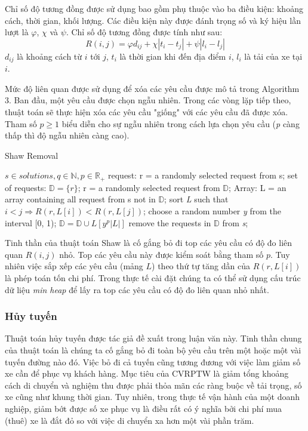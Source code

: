 Chỉ số độ tương đồng được sử dụng bao gồm phụ thuộc vào ba điều kiện: khoảng cách, thời gian, khối lượng. Các điều kiện này được đánh trọng số và ký hiệu lần lượt là $\varphi$, $\chi$ và $\psi$. Chỉ số độ tương đồng được tính như sau:
\begin{equation}
	\label{eq:shaw_related}
	R(i,j) = \varphi d_{ij} + \chi |t_{i}-t_{j}| + \psi|l_i - l_j|
\end{equation}
$d_{ij}$ là khoảng cách từ $i$ tới $j$, $t_i$ là thời gian khi đến địa điểm $i$, $l_i$ là tải của xe tại $i$.

Mức độ liên quan được sử dụng để xóa các yêu cầu được mô tả trong Algorithm 3. Ban đầu, một yêu cầu được chọn ngẫu nhiên. Trong các vòng lặp tiếp theo, thuật toán sẽ thực hiện xóa các yêu cầu "giống" với các yêu cầu đã được xóa. Tham số $p \geqslant 1$ biểu diễn cho sự ngẫu nhiên trong cách lựa chọn yêu cầu (\textit{p} càng thấp thì độ ngẫu nhiên càng cao).

\begin{algorithm}
	\caption{Shaw Removal}
	\begin{algorithmic}[1]
		\Require $s \in {solutions}, q \in \mathbb{N}, p \in \mathbb{R}_{+}$
		\State request: r = a randomly selected request from s;
		\State set of requests: $\mathbb{D}=\{r\}$;
		\State r = a randomly selected request from $\mathbb{D}$;
		\State Array: L = an array containing all request from s not in $\mathbb{D}$;
		\State sort \textit{L} such that $i<j \Rightarrow R(r, L\left[ i \right]) < R(r, L\left[ j \right])$;
		\State choose a random number \textit{y} from the interval [0, 1);
		\State $\mathbb{D}=\mathbb{D}\cup {L \left[ y^p|L| \right]}$
		\EndWhile
		\State remove the requests in $\mathbb{D}$ from \textit{s};
	\end{algorithmic}
\end{algorithm}

Tinh thần của thuật toán Shaw là cố gắng bỏ đi top các yêu cầu có độ đo liên quan $R(i,j)$ nhỏ. Top các yêu cầu này được kiểm soát bằng tham số $p$. Tuy nhiên việc sắp xếp các yêu cầu (mảng $L$) theo thứ tự tăng dần của $R(r, L[i])$ là phép toán tốn chi phí. Trong thực tế cài đặt chúng ta có thể sử dụng cấu trúc dữ liệu \textit{min heap} để lấy ra top các yêu cầu có độ đo liên quan nhỏ nhất.

\subsubsection*{Hủy tuyến}
Thuật toán hủy tuyến được tác giả đề xuất trong luận văn này. Tinh thần chung của thuật toán là chúng ta cố gắng bỏ đi toàn bộ yêu cầu trên một hoặc một vài tuyến đường nào đó. Việc bỏ đi cả tuyến cũng tương đương với việc làm giảm số xe cần để phục vụ khách hàng. Mục tiêu của CVRPTW là giảm tổng khoảng cách di chuyển và nghiệm thu được phải thỏa mãn các ràng buộc về tải trọng, số xe cũng như khung thời gian. Tuy nhiên, trong thực tế vận hành của một doanh nghiệp, giảm bớt được số xe phục vụ là điều rất có ý nghĩa bởi chi phí mua (thuê) xe là đắt đỏ so với việc di chuyển xa hơn một vài phần trăm.

